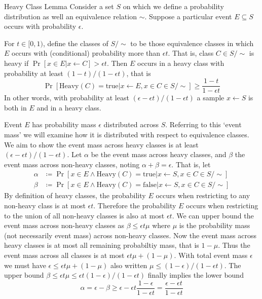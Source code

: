 \begin{lemma}{Heavy Class Lemma}
    Consider a set $S$ on which we define a probability distribution as well an equivalence relation $\sim$.
    Suppose a particular event $E\subseteq S$ occurs with probability $\epsilon$.

    For $t\in[0,1)$, define the  classes of $S/\sim$ to be those equivalence classes in which $E$ occurs with (conditional) probability more than $\epsilon t$.
    That is, class $C\in S/\sim$ is heavy if $\Pr[x\in E|x\leftarrow C]>\epsilon t$.
    Then $E$ occurs in a heavy class with probability at least $(1-t)/(1-\epsilon t)$, that is
    \begin{equation}
        \Pr[\text{Heavy}(C)=\text{true}|x\leftarrow E, x\in C\in S/\sim]
        \geq \frac{1-t}{1-\epsilon t}
    \end{equation}
    In other words, with probability at least $(\epsilon-\epsilon t)/(1-\epsilon t)$ a sample $x\leftarrow S$ is both in $E$ and in a heavy class.

    \proof
    Event $E$ has probability mass $\epsilon$ distributed across $S$.
    Referring to this `event mass' we will examine how it is distributed with respect to equivalence classes.
    We aim to show the event mass across heavy classes is at least $(\epsilon-\epsilon t)/(1-\epsilon t)$.
    Let $\alpha$ be the event mass across heavy classes, and $\beta$ the event mass across non-heavy classes, noting $\alpha+\beta=\epsilon$.
    That is, let
    \begin{align}
        \alpha &\coloneq \Pr[
            x\in E \land\text{Heavy}(C)=\text{true}
            |x\leftarrow S, x\in C\in S/\sim
        ] \\
        \beta &\coloneq \Pr[
            x\in E \land\text{Heavy}(C)=\text{false}
            |x\leftarrow S, x\in C\in S/\sim
        ]
    \end{align}
    By definition of heavy classes, the probability $E$ occurs when restricting to any non-heavy class is at most $\epsilon t$.
    Therefore the probability $E$ occurs when restricting to the union of all non-heavy classes is also at most $\epsilon t$.
    We can upper bound the event mass across non-heavy classes as $\beta\leq\epsilon t\mu$ where $\mu$ is the probability mass (not necessarily event mass) across non-heavy classes.
    Now the event mass across heavy classes is at most all remaining probabiltiy mass, that is $1-\mu$.
    Thus the event mass across all classes is at most $\epsilon t\mu+(1-\mu)$.
    With total event mass $\epsilon$ we must have $\epsilon\leq\epsilon t\mu+(1-\mu)$ also written $\mu\leq(1-\epsilon)/(1-\epsilon t)$.
    The upper bound $\beta\leq\epsilon t\mu\leq\epsilon t(1-\epsilon)/(1-\epsilon t)$ finally implies the lower bound
    \begin{equation}
        \alpha = \epsilon - \beta
        \geq \epsilon - \epsilon t\frac{1-\epsilon}{1-\epsilon t}
        = \frac{\epsilon - \epsilon t}{1 - \epsilon t}
    \end{equation}
\end{lemma}

